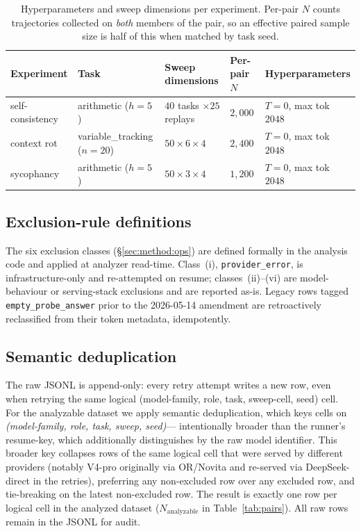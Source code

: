 \begin{table}[!htbp]
\centering
\small
\begin{tabular}{l l l l l}
\toprule
Experiment & Task & Sweep dimensions & Per-pair $N$ & Hyperparameters \\
\midrule
self-consistency
  & arithmetic ($h{=}5$)
  & $40$ tasks $\times 25$ replays
  & $2{,}000$
  & $T{=}0$, max tok $2048$ \\
context rot
  & variable\_tracking ($n{=}20$)
  & $50 \times 6 \times 4$
  & $2{,}400$
  & $T{=}0$, max tok $2048$ \\
sycophancy
  & arithmetic ($h{=}5$)
  & $50 \times 3 \times 4$
  & $1{,}200$
  & $T{=}0$, max tok $2048$ \\
\bottomrule
\end{tabular}
\caption{Hyperparameters and sweep dimensions per experiment.
Per-pair $N$ counts trajectories collected on \emph{both} members of
the pair, so an effective paired sample size is half of this when
matched by task seed.}
\label{tab:hparams}
\end{table}

\subsection{Exclusion-rule definitions}

The six exclusion classes (\S\ref{sec:method:ops}) are defined formally
in the analysis code and applied at analyzer read-time. Class~(i),
\texttt{provider\_error}, is
infrastructure-only and re-attempted on resume; classes~(ii)--(vi) are
model-behaviour or serving-stack exclusions and are reported as-is.
Legacy rows tagged \texttt{empty\_probe\_answer} prior to the
2026-05-14 amendment are retroactively reclassified from their token
metadata, idempotently.

\subsection{Semantic deduplication}
\label{sec:methods:dedup}

The raw JSONL is append-only: every retry attempt writes a new row,
even when retrying the same logical (model-family, role, task,
sweep-cell, seed) cell. For the analyzable dataset we apply semantic
deduplication, which keys cells on
\emph{(model-family, role, task, sweep, seed)}---
intentionally broader than the runner's resume-key, which additionally
distinguishes by the raw model identifier. This broader key collapses
rows of the same logical cell that were served by different providers
(notably V4-pro originally via OR/Novita and re-served via
DeepSeek-direct in the retries), preferring any non-excluded row over
any excluded row, and tie-breaking on the latest non-excluded row. The
result is exactly one row per logical cell in the analyzed dataset
($N_{\mathrm{analyzable}}$ in Table~\ref{tab:pairs}). All raw rows
remain in the JSONL for audit.


